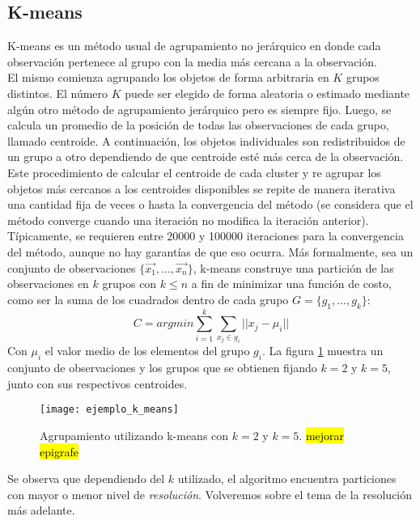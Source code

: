 \subsection{K-means}
K-means es un método usual de agrupamiento no jerárquico en donde cada observación pertenece al grupo con la media más cercana a la observación.\\
El mismo comienza agrupando los objetos de forma arbitraria en $K$ grupos distintos. El número $K$ puede ser elegido de forma aleatoria o estimado mediante algún otro método de agrupamiento jerárquico pero es siempre fijo. Luego, se calcula un promedio de la posición de todas las observaciones de cada grupo, llamado centroide. A continuación, los objetos individuales son redistribuidos de un grupo a otro dependiendo de que centroide esté más cerca de la observación. Este procedimiento de calcular el centroide de cada cluster y re agrupar los objetos más cercanos a los centroides disponibles se repite de manera iterativa una cantidad fija de veces o hasta la convergencia del método (se considera que el método converge cuando una iteración no modifica la iteración anterior).\\
Típicamente, se requieren entre 20000 y 100000 iteraciones para la convergencia del método, aunque no hay garantías de que eso ocurra.
Más formalmente, sea un conjunto de observaciones $\{\vec{x_1},...,\vec{x_n}\}$, k-means construye una partición de las observaciones en $k$ grupos con $k \leq n$ a fin de minimizar una función de costo, como ser la suma de los cuadrados dentro de cada grupo $G = \{g_1,...,g_k\}$: 
\begin{equation}
	C = argmin\sum\limits_{i=1}^k \sum\limits_{x_j \in g_i}||x_j-\mu_i||
\end{equation}
Con $\mu_i$ el valor medio de los elementos del grupo $g_i$.
La figura \ref{fig:ejemplo_k_means} muestra un conjunto de observaciones y los grupos que se obtienen fijando $k=2$ y $k=5$, junto con sus respectivos centroides.
\begin{figure}[h]
    \centering
    \texttt{[image: ejemplo\_k\_means]}
    \caption{Agrupamiento utilizando k-means con $k=2$ y $k=5$. \hl{mejorar epigrafe}}
    \label{fig:ejemplo_k_means}
\end{figure}
Se observa que dependiendo del $k$ utilizado, el algoritmo encuentra particiones con mayor o menor nivel de \textit{resolución}. Volveremos sobre el tema de la resolución más adelante.
\cite{Kogan2006}\cite{Hartigan1979}

